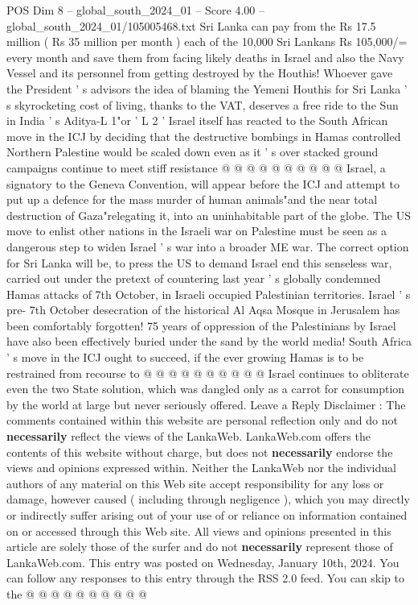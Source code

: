 \begin{textsample}{POS Dim 8 – global\_south\_2024\_01 – Score 4.00 – global\_south\_2024\_01/105005468.txt}
Sri Lanka can pay from the Rs 17.5 million ( Rs 35 million per month ) each of the 10,000 Sri Lankans Rs 105,000/= every month and save them from facing likely deaths in Israel and also the Navy Vessel and its personnel from getting destroyed by the Houthis!
Whoever gave the President ' s advisors the idea of blaming the Yemeni Houthis for Sri Lanka ' s skyrocketing cost of living, thanks to the VAT, deserves a free ride to the Sun in India ' s Aditya-L 1"or ' L 2 ' Israel itself has reacted to the South African move in the ICJ by deciding that the destructive bombings in Hamas controlled Northern Palestine would be scaled down even as it ' s over stacked ground campaigns continue to meet stiff resistance @ @ @ @ @ @ @ @ @ @ Israel, a signatory to the Geneva Convention, will appear before the ICJ and attempt to put up a defence for the mass murder of human animals"and the near total destruction of Gaza"relegating it, into an uninhabitable part of the globe.
The US move to enlist other nations in the Israeli war on Palestine must be seen as a dangerous step to widen Israel ' s war into a broader ME war.
The correct option for Sri Lanka will be, to press the US to demand Israel end this senseless war, carried out under the pretext of countering last year ' s globally condemned Hamas attacks of 7th October, in Israeli occupied Palestinian territories.
Israel ' s pre- 7th October desecration of the historical Al Aqsa Mosque in Jerusalem has been comfortably forgotten! 75 years of oppression of the Palestinians by Israel have also been effectively buried under the sand by the world media!
South Africa ' s move in the ICJ ought to succeed, if the ever growing Hamas is to be restrained from recourse to @ @ @ @ @ @ @ @ @ @ Israel continues to obliterate even the two State solution, which was dangled only as a carrot for consumption by the world at large but never seriously offered.
Leave a Reply Disclaimer : The comments contained within this website are personal reflection only and do not \textbf{necessarily} reflect the views of the LankaWeb.
LankaWeb.com offers the contents of this website without charge, but does not \textbf{necessarily} endorse the views and opinions expressed within.
Neither the LankaWeb nor the individual authors of any material on this Web site accept responsibility for any loss or damage, however caused ( including through negligence ), which you may directly or indirectly suffer arising out of your use of or reliance on information contained on or accessed through this Web site.
All views and opinions presented in this article are solely those of the surfer and do not \textbf{necessarily} represent those of LankaWeb.com.
This entry was posted on Wednesday, January 10th, 2024.
You can follow any responses to this entry through the RSS 2.0 feed.
You can skip to the @ @ @ @ @ @ @ @ @ @

\end{textsample}
